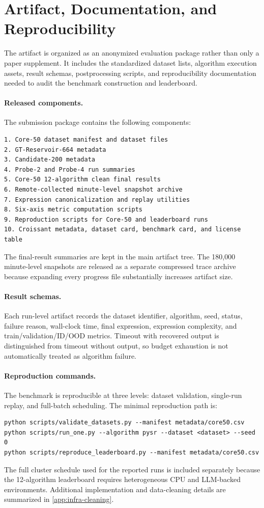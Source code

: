 \section{Artifact, Documentation, and Reproducibility}

The \arena{} artifact is organized as an anonymized evaluation package rather than only a paper supplement. It includes the standardized dataset lists, algorithm execution assets, result schemas, postprocessing scripts, and reproducibility documentation needed to audit the benchmark construction and leaderboard.

\paragraph{Released components.}
The submission package contains the following components:
\begin{verbatim}
1. Core-50 dataset manifest and dataset files
2. GT-Reservoir-664 metadata
3. Candidate-200 metadata
4. Probe-2 and Probe-4 run summaries
5. Core-50 12-algorithm clean final results
6. Remote-collected minute-level snapshot archive
7. Expression canonicalization and replay utilities
8. Six-axis metric computation scripts
9. Reproduction scripts for Core-50 and leaderboard runs
10. Croissant metadata, dataset card, benchmark card, and license table
\end{verbatim}

The final-result summaries are kept in the main artifact tree. The 180,000 minute-level snapshots are released as a separate compressed trace archive because expanding every progress file substantially increases artifact size.

\paragraph{Result schemas.}
Each run-level artifact records the dataset identifier, algorithm, seed, status, failure reason, wall-clock time, final expression, expression complexity, and train/validation/ID/OOD metrics. Timeout with recovered output is distinguished from timeout without output, so budget exhaustion is not automatically treated as algorithm failure.

\paragraph{Reproduction commands.}
The benchmark is reproducible at three levels: dataset validation, single-run replay, and full-batch scheduling. The minimal reproduction path is:
\begin{verbatim}
python scripts/validate_datasets.py --manifest metadata/core50.csv
python scripts/run_one.py --algorithm pysr --dataset <dataset> --seed 0
python scripts/reproduce_leaderboard.py --manifest metadata/core50.csv
\end{verbatim}
The full cluster schedule used for the reported runs is included separately because the 12-algorithm leaderboard requires heterogeneous CPU and LLM-backed environments. Additional implementation and data-cleaning details are summarized in \cref{app:infra-cleaning}.

